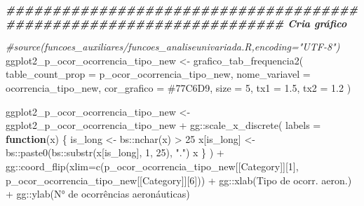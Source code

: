 \documentclass[
]{article}
\newenvironment{Shaded}{\begin{snugshade}}{\end{snugshade}}
\newcommand{\AttributeTok}[1]{\textcolor[rgb]{0.77,0.63,0.00}{#1}}
\newcommand{\CommentTok}[1]{\textcolor[rgb]{0.56,0.35,0.01}{\textit{#1}}}
\newcommand{\ControlFlowTok}[1]{\textcolor[rgb]{0.13,0.29,0.53}{\textbf{#1}}}
\newcommand{\DecValTok}[1]{\textcolor[rgb]{0.00,0.00,0.81}{#1}}
\newcommand{\DocumentationTok}[1]{\textcolor[rgb]{0.56,0.35,0.01}{\textbf{\textit{#1}}}}
\newcommand{\FloatTok}[1]{\textcolor[rgb]{0.00,0.00,0.81}{#1}}
\newcommand{\FunctionTok}[1]{\textcolor[rgb]{0.00,0.00,0.00}{#1}}
\newcommand{\NormalTok}[1]{#1}
\newcommand{\OtherTok}[1]{\textcolor[rgb]{0.56,0.35,0.01}{#1}}
\newcommand{\SpecialCharTok}[1]{\textcolor[rgb]{0.00,0.00,0.00}{#1}}
\newcommand{\StringTok}[1]{\textcolor[rgb]{0.31,0.60,0.02}{#1}}
\begin{document}
\begin{Shaded}
\begin{Highlighting}[]
\DocumentationTok{\#\#\#\#\#\#\#\#\#\#\#\#\#\#\#\#\#\#\#\#\#\#\#\#\#\#\#\#\#\#\#\#\#\#\#\#\#\#\#\#\#\#\#\#\#\#\#\#\#\#\#\#\#\#\#\#\#\#\#\#\#\#\#\#\#\#\#\# Cria gráfico}

\CommentTok{\#source(\textquotesingle{}funcoes\_auxiliares/funcoes\_analiseunivariada.R\textquotesingle{},encoding="UTF{-}8")}
\NormalTok{ggplot2\_p\_ocor\_ocorrencia\_tipo\_new }\OtherTok{\textless{}{-}} \FunctionTok{grafico\_tab\_frequencia2}\NormalTok{(}
    \AttributeTok{table\_count\_prop =}\NormalTok{ p\_ocor\_ocorrencia\_tipo\_new,}
    \AttributeTok{nome\_variavel =} \StringTok{\textquotesingle{}ocorrencia\_tipo\_new\textquotesingle{}}\NormalTok{,}
    \AttributeTok{cor\_grafico =} \StringTok{\textquotesingle{}\#77C6D9\textquotesingle{}}\NormalTok{,}
    \AttributeTok{size =} \DecValTok{5}\NormalTok{,}
    \AttributeTok{tx1 =} \FloatTok{1.5}\NormalTok{,}
    \AttributeTok{tx2 =} \FloatTok{1.2}
\NormalTok{)}

\NormalTok{ggplot2\_p\_ocor\_ocorrencia\_tipo\_new }\OtherTok{\textless{}{-}}\NormalTok{ ggplot2\_p\_ocor\_ocorrencia\_tipo\_new }\SpecialCharTok{+} 
\NormalTok{                                        gg}\SpecialCharTok{::}\FunctionTok{scale\_x\_discrete}\NormalTok{(}
                                        \AttributeTok{labels =} \ControlFlowTok{function}\NormalTok{(x) \{}
\NormalTok{                                              is\_long }\OtherTok{\textless{}{-}}\NormalTok{ bs}\SpecialCharTok{::}\FunctionTok{nchar}\NormalTok{(x) }\SpecialCharTok{\textgreater{}} \DecValTok{25}
\NormalTok{                                              x[is\_long] }\OtherTok{\textless{}{-}}\NormalTok{ bs}\SpecialCharTok{::}\FunctionTok{paste0}\NormalTok{(bs}\SpecialCharTok{::}\FunctionTok{substr}\NormalTok{(x[is\_long], }\DecValTok{1}\NormalTok{, }\DecValTok{25}\NormalTok{), }\StringTok{"."}\NormalTok{)}
\NormalTok{                                              x}
\NormalTok{                                            \}}
\NormalTok{                                          ) }\SpecialCharTok{+}
\NormalTok{    gg}\SpecialCharTok{::}\FunctionTok{coord\_flip}\NormalTok{(}\AttributeTok{xlim=}\FunctionTok{c}\NormalTok{(p\_ocor\_ocorrencia\_tipo\_new[[}\StringTok{\textquotesingle{}Category\textquotesingle{}}\NormalTok{]][}\DecValTok{1}\NormalTok{],}
\NormalTok{                         p\_ocor\_ocorrencia\_tipo\_new[[}\StringTok{\textquotesingle{}Category\textquotesingle{}}\NormalTok{]][}\DecValTok{6}\NormalTok{])) }\SpecialCharTok{+}
\NormalTok{    gg}\SpecialCharTok{::}\FunctionTok{xlab}\NormalTok{(}\StringTok{\textquotesingle{}Tipo de ocorr. aeron.\textquotesingle{}}\NormalTok{) }\SpecialCharTok{+}
\NormalTok{    gg}\SpecialCharTok{::}\FunctionTok{ylab}\NormalTok{(}\StringTok{\textquotesingle{}N° de ocorrências aeronáuticas\textquotesingle{}}\NormalTok{)}


\end{Highlighting}
\end{Shaded}
\end{document}
